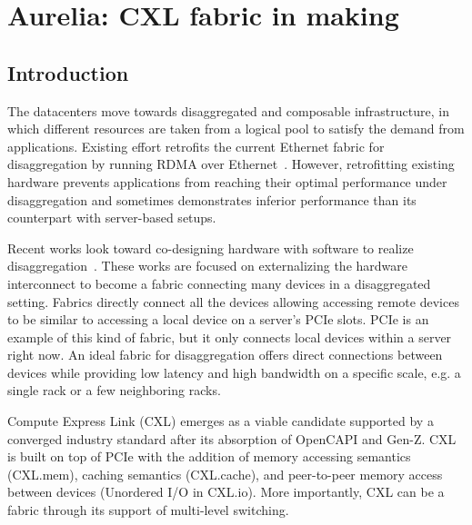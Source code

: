 \chapter{Aurelia: CXL fabric in making}
\label{chap:aurelia}

\section{Introduction}
The datacenters move towards disaggregated and composable infrastructure, in which different resources are taken from a logical pool to satisfy the demand from applications.
%
Existing effort retrofits the current Ethernet fabric for disaggregation by running RDMA over Ethernet~\cite{legoos:osdi:2018, far-memory:eurosys:2020, leap:atc:2020,aifm:osdi:2020,carbink:osdi:2022,hydra:fast:2022,canvas:nsdi:2023}.
%
However, retrofitting existing hardware prevents applications from reaching their optimal performance under disaggregation and sometimes demonstrates inferior performance than its counterpart with server-based setups.

Recent works look toward co-designing hardware with software to realize disaggregation~\cite{kona:asplos:2021, intel-cxl:ieee-micro:2023, tpp:asplos:2023, pond:asplos:2023}.
%
These works are focused on externalizing the hardware interconnect to become a fabric connecting many devices in a disaggregated setting.
%
Fabrics directly connect all the devices allowing accessing remote devices to be similar to accessing a local device on a server's PCIe slots.  
%
PCIe is an example of this kind of fabric, but it only connects local devices within a server right now.
%
%
%
An ideal fabric for disaggregation offers direct connections between devices while providing low latency and high bandwidth on a specific scale, e.g. a single rack or a few neighboring racks.

Compute Express Link (CXL) emerges as a viable candidate supported by a converged industry standard after its absorption of OpenCAPI and Gen-Z. 
%
CXL is built on top of PCIe with the addition of memory accessing semantics (CXL.mem), caching semantics (CXL.cache), and peer-to-peer memory access between devices (Unordered I/O in CXL.io). 
%
%
More importantly, CXL can be a fabric through its support of multi-level switching.

